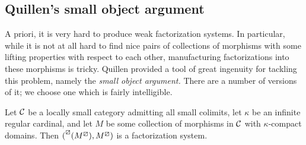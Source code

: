 \subsection{Quillen's small object argument}
A priori, it is very hard to produce weak factorization systems. In particular, while it is not at all hard to find nice pairs of collections of morphisms with some
lifting properties with respect to each other, manufacturing factorizations into these morphisms is tricky. Quillen provided a tool of great ingenuity for tackling this problem,
namely the \emph{small object argument.} There are a number of versions of it; we choose one which is fairly intelligible.

\begin{proposition}\label{prop:small-object-argument}
	Let \(\mathcal{C}\) be a locally small category admitting all small colimits, let \(\kappa\) be an infinite regular cardinal, and let \(M\) be some collection of morphisms
	in \(\mathcal{C}\) with \(\kappa\)-compact domains. Then \((\prescript{\boxslash}{}{(M^\boxslash)}, M^\boxslash)\) is a factorization system.
\end{proposition}
